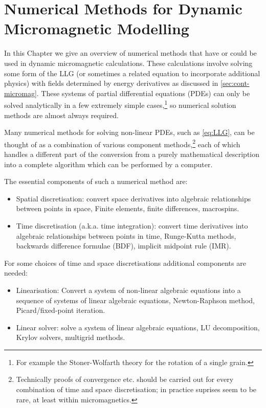 \chapter{Numerical Methods for Dynamic Micromagnetic Modelling}
\label{sec:numer-meth-micr}

In this Chapter we give an overview of numerical methods that have or could be used in dynamic micromagnetic calculations.
These calculations involve solving some form of the LLG (or sometimes a related equation to incorporate additional physics) with fields determined by energy derivatives as discussed in \autoref{sec:cont-micromag}.
These systems of partial differential equations (PDEs) can only be solved analytically in a few extremely simple cases,\footnote{For example the Stoner-Wolfarth theory for the rotation of a single grain.\cite{Stoner1948a}}\cite{Aharoni1996} so numerical solution methods are almost always required.

Many numerical methods for solving non-linear PDEs, such as \eqref{eq:LLG}, can be thought of as a combination of various component methods,\footnote{Technically proofs of convergence etc. should be carried out for every combination of time and space discretisation\cite[382]{Iserles2009}; in practice suprises seem to be rare, at least within micromagnetics.} each of which handles a different part of the conversion from a purely mathematical description into a complete algorithm which can be performed by a computer.

The essential components of such a numerical method are:
\begin{itemize}
\item Spatial discretisation: convert space derivatives into algebraic relationships between points in space, \eg Finite elements, finite differences, macrospins. 
\item Time discretisation (a.k.a. time integration):  convert time derivatives into algebraic relationships between points in time, \eg Runge-Kutta methods, backwards difference formulae (BDF), implicit midpoint rule (IMR).
\end{itemize}
For some choices of time and space discretisations additional components are needed:
\begin{itemize}
\item Linearisation: Convert a system of non-linear algebraic equations into a sequence of systems of linear algebraic equations, \eg Newton-Raphson method, Picard/fixed-point iteration. 
\item Linear solver: solve a system of linear algebraic equations, \eg LU decomposition, Krylov solvers, multigrid methods. 
\end{itemize}

